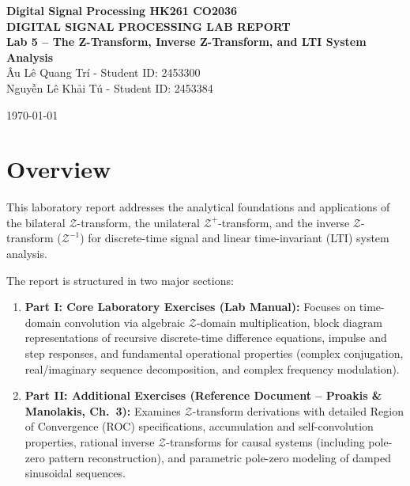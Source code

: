 \documentclass[12pt,a4paper]{article}
\begin{document}
\begin{center}
    \textbf{Digital Signal Processing \hfill HK261 \hfill CO2036}\\[2cm]

    \huge\textbf{DIGITAL SIGNAL PROCESSING LAB REPORT}\\[0.5cm]
    \Large\textbf{Lab 5 -- The Z-Transform, Inverse Z-Transform, and LTI System Analysis}\\[1cm]

    \large Âu Lê Quang Trí - Student ID: 2453300\\[0.5cm]
    \large Nguyễn Lê Khải Tú - Student ID: 2453384\\[0.5cm]
    \vspace{0.5cm}

    \large \today\\[2cm]
\end{center}

\section*{Overview}
This laboratory report addresses the analytical foundations and applications of the bilateral $\mathcal{Z}$-transform, the unilateral $\mathcal{Z}^+$-transform, and the inverse $\mathcal{Z}$-transform ($\mathcal{Z}^{-1}$) for discrete-time signal and linear time-invariant (LTI) system analysis. 

The report is structured in two major sections:
\begin{enumerate}
    \item \textbf{Part I: Core Laboratory Exercises (Lab Manual):} Focuses on time-domain convolution via algebraic $\mathcal{Z}$-domain multiplication, block diagram representations of recursive discrete-time difference equations, impulse and step responses, and fundamental operational properties (complex conjugation, real/imaginary sequence decomposition, and complex frequency modulation).
    \item \textbf{Part II: Additional Exercises (Reference Document -- Proakis \& Manolakis, Ch.~3):} Examines $\mathcal{Z}$-transform derivations with detailed Region of Convergence (ROC) specifications, accumulation and self-convolution properties, rational inverse $\mathcal{Z}$-transforms for causal systems (including pole-zero pattern reconstruction), and parametric pole-zero modeling of damped sinusoidal sequences.
\end{enumerate}

\tableofcontents
\end{document}

